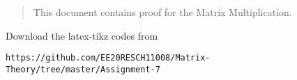 \documentclass[journal,12pt,twocolumn]{IEEEtran}
\begin{document}
% 
\maketitle
\newpage
\bigskip
\renewcommand{\thefigure}{\theenumi}
\renewcommand{\thetable}{\theenumi}
%
%
\begin{abstract}
This document contains proof for the Matrix Multiplication.
\end{abstract}
Download the latex-tikz codes from 
%
\begin{lstlisting}
https://github.com/EE20RESCH11008/Matrix-Theory/tree/master/Assignment-7
\end{lstlisting}
\end{document}
